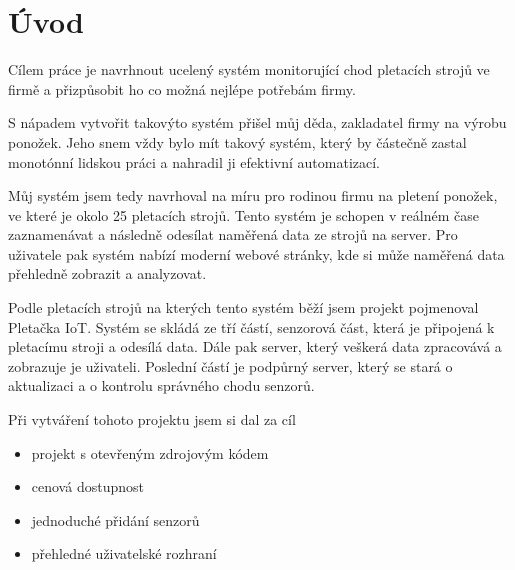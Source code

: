 \chapter*{Úvod}

Cílem práce je navrhnout ucelený systém monitorující chod pletacích strojů ve firmě a přizpůsobit ho co možná nejlépe potřebám firmy.

S nápadem vytvořit takovýto systém přišel můj děda, zakladatel firmy na výrobu ponožek.
Jeho snem vždy bylo mít takový systém, který by částečně zastal monotónní lidskou práci a nahradil ji efektivní automatizací.

Můj systém jsem tedy navrhoval na míru pro rodinou firmu na pletení ponožek, ve které je okolo 25 pletacích strojů. 
Tento systém je schopen v reálném čase zaznamenávat a následně odesílat naměřená data ze strojů na server. 
Pro uživatele pak systém nabízí moderní webové stránky, kde si může naměřená data přehledně zobrazit a analyzovat.

Podle pletacích strojů na kterých tento systém běží jsem projekt pojmenoval Pletačka IoT. 
Systém se skládá ze tří částí, senzorová část, která je připojená k pletacímu stroji a odesílá data.
Dále pak server, který veškerá data zpracovává a zobrazuje je uživateli.
Poslední částí je podpůrný server, který se stará o aktualizaci a o kontrolu správného chodu senzorů.\newline



Při vytváření tohoto projektu jsem si dal za cíl
\begin{itemize}
    \item projekt s otevřeným zdrojovým kódem
    \item cenová dostupnost
    \item jednoduché přidání senzorů
    \item přehledné uživatelské rozhraní
\end{itemize}

\newpage
